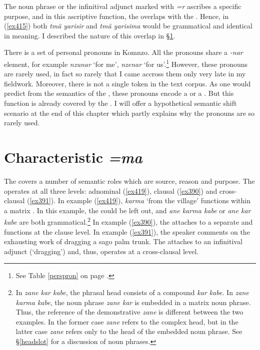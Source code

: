 The noun phrase or the infinitival adjunct marked with \emph{=r} ascribes a specific purpose, and in this ascriptive function, the  overlaps with the  . Hence, in (\ref{ex415}) both \emph{tmä yarisir} and \emph{tmä yarisima} would be grammatical and identical in meaning. I described the nature of this overlap in \S{}\ref{charcase}.%

There is a set of  personal pronouns in Komnzo. All the pronouns share a \emph{-nar} element, for example \emph{nzunar} `for me', \emph{nzenar} `for us'.\footnote{See Table \ref{perspron} on page \pageref{perspron}.} However, these pronouns are rarely used, in fact so rarely that I came accross them only very late in my fieldwork. Moreover, there is not a single token in the text corpus. As one would predict from the semantics of the  , these pronouns encode a  or a . But this function is already covered by the  . I will offer a hypothetical semantic shift scenario at the end of this chapter which partly explains why the  pronouns are so rarely used.

\section{Characteristic \emph{=ma}} \label{charcase}

The   covers a number of semantic roles which are source, reason and purpose. The  operates at all three levels: adnominal (\ref{ex419}), clausal (\ref{ex390}) and cross-clausal (\ref{ex391}). In example (\ref{ex419}), \emph{karma} `from the village' functions within a matrix . In this example, the  could be left out, and \emph{ane karma kabe} or \emph{ane kar kabe} are both grammatical.\footnote{In \emph{zane kar kabe}, the phrasal head consists of a compound \emph{kar kabe}. In \emph{zane karma kabe}, the noun phrase \emph{zane kar} is embedded in a matrix noun phrase. Thus, the reference of the demonstrative \emph{zane} is different between the two examples. In the former case \emph{zane} refers to the complex head, but in the latter case \emph{zane} refers only to the head of the embedded noun phrase. See \S{}\ref{headslot} for a discussion of noun phrases.} In example (\ref{ex390}), the   attaches to a separate  and functions at the clause level. In example (\ref{ex391}), the speaker comments on the exhausting work of dragging a sago palm trunk. The   attaches to an infinitival adjunct (`dragging') and, thus, operates at a cross-clausal level.

